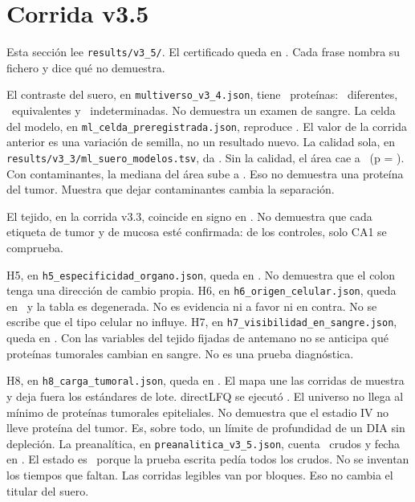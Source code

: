 \section{Corrida v3.5}
Esta sección lee \texttt{results/v3\_5/}. El certificado queda en \VcincoEstado. Cada frase nombra su fichero y dice qué no demuestra.

El contraste del suero, en \texttt{multiverso\_v3\_4.json}, tiene \VcincoSueroN\ proteínas: \VcincoSueroDif\ diferentes, \VcincoSueroEq\ equivalentes y \VcincoSueroInd\ indeterminadas. No demuestra un examen de sangre. La celda del modelo, en \texttt{ml\_celda\_preregistrada.json}, reproduce \VcincoMdos. El valor de la corrida anterior es una variación de semilla, no un resultado nuevo. La calidad sola, en \texttt{results/v3\_3/ml\_suero\_modelos.tsv}, da \VcincoMtres. Sin la calidad, el área cae a \VcincoMcinco\ (p = \VcincoMcincoP). Con contaminantes, la mediana del área sube a \VcincoAucContaminantes. Eso no demuestra una proteína del tumor. Muestra que dejar contaminantes cambia la separación.

El tejido, en la corrida v3.3, coincide en signo en \VcincoTejido. No demuestra que cada etiqueta de tumor y de mucosa esté confirmada: de los controles, solo CA1 se comprueba.

H5, en \texttt{h5\_especificidad\_organo.json}, queda en \VcincoHcinco. No demuestra que el colon tenga una dirección de cambio propia. H6, en \texttt{h6\_origen\_celular.json}, queda en \VcincoHseis\ y la tabla es degenerada. No es evidencia ni a favor ni en contra. No se escribe que el tipo celular no influye. H7, en \texttt{h7\_visibilidad\_en\_sangre.json}, queda en \VcincoHsiete. Con las variables del tejido fijadas de antemano no se anticipa qué proteínas tumorales cambian en sangre. No es una prueba diagnóstica.

H8, en \texttt{h8\_carga\_tumoral.json}, queda en \VcincoHocho. El mapa une las corridas de muestra y deja fuera los estándares de lote. directLFQ se ejecutó \cite{ammar2023}. El universo no llega al mínimo de proteínas tumorales epiteliales. No demuestra que el estadio IV no lleve proteína del tumor. Es, sobre todo, un límite de profundidad de un DIA sin depleción. La preanalítica, en \texttt{preanalitica\_v3\_5.json}, cuenta \VcincoPreCrudos\ crudos y fecha en \VcincoPreFecha. El estado es \VcincoPreEstado\ porque la prueba escrita pedía todos los crudos. No se inventan los tiempos que faltan. Las corridas legibles van por bloques. Eso no cambia el titular del suero.

